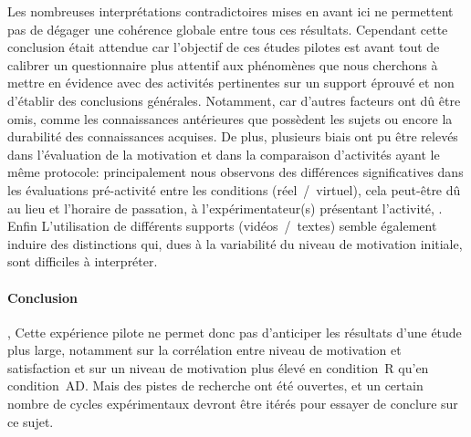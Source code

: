                 Les nombreuses interprétations contradictoires mises en avant ici ne permettent pas de dégager une cohérence globale entre tous ces résultats. Cependant cette conclusion était attendue car l'objectif de ces études pilotes est avant tout de calibrer un questionnaire plus attentif aux phénomènes que nous cherchons à mettre en évidence avec des activités pertinentes sur un support éprouvé et non d'établir des conclusions générales. Notamment, car d'autres facteurs ont dû être omis, comme les connaissances antérieures que possèdent les sujets ou encore la durabilité des connaissances acquises. De plus, plusieurs biais ont pu être relevés dans l'évaluation de la motivation et dans la comparaison d'activités ayant le même protocole: principalement nous observons des différences significatives dans les évaluations pré-activité entre les conditions (réel~/~virtuel), cela peut-être dû au lieu et l'horaire de passation, à l'expérimentateur(s) présentant l'activité, \etc. Enfin L'utilisation de différents supports (vidéos~/~textes) semble également induire des distinctions qui, dues à la variabilité du niveau de motivation initiale, sont difficiles à interpréter. 
            \paragraph{Conclusion},
                Cette expérience pilote ne permet donc pas d'anticiper les résultats d'une étude plus large, notamment sur la corrélation entre niveau de motivation et satisfaction et sur un niveau de motivation plus élevé en condition~R qu'en condition~AD. Mais des pistes de recherche ont été ouvertes, et un certain nombre de cycles expérimentaux devront être itérés pour essayer de conclure sur ce sujet.
